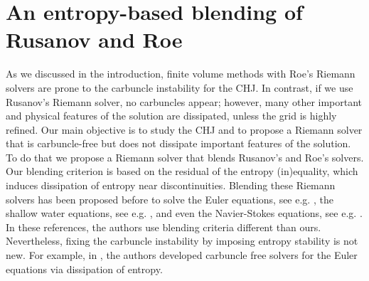 \documentclass[preprint, 11pt]{article}
\begin{document}
\section{An entropy-based blending of Rusanov and Roe}

As we discussed in the introduction, finite volume methods with
Roe's Riemann solvers are prone to the carbuncle instability for the CHJ.
In contrast, if we use Rusanov's
Riemann solver, no carbuncles appear; however, many other important and physical features of
the solution are dissipated, unless the grid is highly refined.
Our main objective is to study the CHJ and to propose a Riemann solver
that is carbuncle-free but does not dissipate important features of the solution.
To do that we propose a Riemann solver that blends Rusanov's and Roe's solvers.
Our blending criterion is based on the residual of the entropy (in)equality,
which induces dissipation of entropy near discontinuities.
Blending these Riemann solvers has been proposed before
to solve the Euler equations, see e.g.
\cite{nishikawa2008very,wang2016developing,jaisankar2007diffusion,ohwada2018simple,deng2019new,ray2013entropy},
the shallow water equations, see e.g. \cite{bader2014carbuncle,kemm2014note},
and even the Navier-Stokes equations, see e.g. \cite{nishikawa2008very,ohwada2018simple}.
In these references, the authors use blending criteria different than ours.
Nevertheless, fixing the carbuncle instability by imposing entropy stability is not new.
For example, in \cite{ismail2009affordable,ismail2009proposed},
the authors developed carbuncle free solvers for the Euler equations
via dissipation of entropy.
\end{document}
